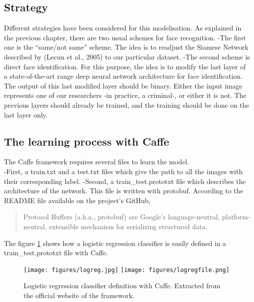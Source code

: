 \subsection{Strategy}
Different strategies have been considered for this modelisation. As explained in the previous chapter, there are two usual schemes for face recognition.\newline
-The first one is the \enquote{same/not same} scheme. The idea is to readjust the Siamese Network described by (Lecun et al., 2005) to our particular dataset.\newline
-The second scheme is direct face identification. For this purpose, the idea is to modify the last layer of a state-of-the-art range deep neural network architecture for face identification. The output of this last modified layer should be binary. Either the input image represents one of our researchers -in practice, a criminal-, or either it is not. The previous layers should already be trained, and the training should be done on the last layer only.

\subsection{The learning process with Caffe}

The Caffe framework requires several files to learn the model.\\
-First, a train.txt and a test.txt files which give the path to all the images with their corresponding label.\newline
-Second, a train\_test.prototxt file which describes the architecture of the network. This file is written with protobuf. According to the README file available on the project's GitHub, \blockquote{Protocol Buffers (a.k.a., protobuf) are Google's language-neutral, platform-neutral, extensible mechanism for serializing structured data.}. The figure \ref{fig:logreg} shows how a logistic regression classifier is easily defined in a train\_test.prototxt file with Caffe.

\begin{figure}[!ht]
  \centering
  \texttt{[image: figures/logreg.jpg]}
  \texttt{[image: figures/logregfile.png]}
  \caption[Logistic regression classifier definition with Caffe. Extracted from the official website of the framework.]{Logistic regression classifier definition with Caffe. Extracted from the official website of the framework.}
  \label{fig:logreg}
\end{figure}


